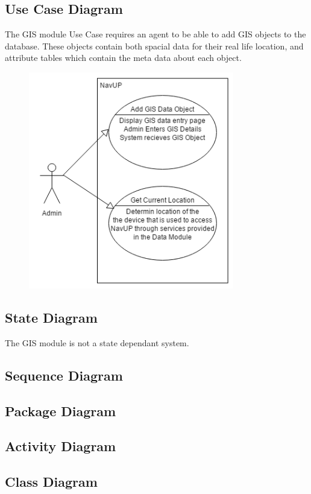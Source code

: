 \subsection{Use Case Diagram}

The GIS module Use Case requires an agent to be able to add GIS objects to the database. These objects contain both spacial data for their real life location, and attribute tables which contain the meta data about each object. \\

\begin{figure} 
  \includegraphics[width=0.8\textwidth]{GIS/GIS_Use_case.png}
\end{figure}

\subsection{State Diagram}
The GIS module is not a state dependant system. \\

\subsection{Sequence Diagram}

\subsection{Package Diagram}

\subsection{Activity Diagram}

\subsection{Class Diagram}
